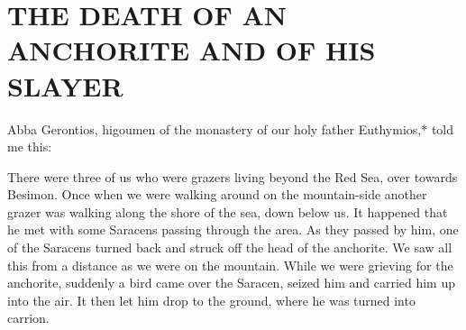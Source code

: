 \chapter{THE DEATH OF AN ANCHORITE AND OF HIS SLAYER}

Abba Gerontios, higoumen of the monastery of our holy father Euthymios,* told me this:

There were three of us who were grazers living beyond the Red Sea, over towards Besimon.
Once when we were walking around on the mountain-side another grazer was walking along the shore of the sea, down below us.
It happened that he met with some Saracens passing through the area.
As they passed by him, one of the Saracens turned back and struck off the head of the anchorite.
We saw all this from a distance as we were on the mountain.
While we were grieving for the anchorite, suddenly a bird came over the Saracen, seized him and carried him up into the air.
It then let him drop to the ground, where he was turned into carrion.
